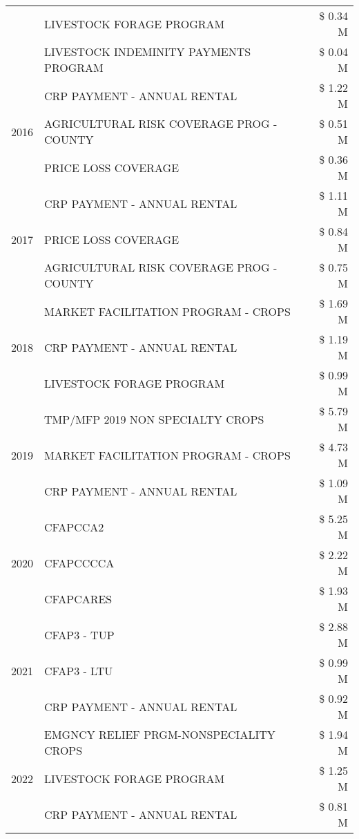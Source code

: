 \begin{tabular}{llr}
 & LIVESTOCK FORAGE PROGRAM & \$ 0.34 M \\
 & LIVESTOCK INDEMINITY PAYMENTS PROGRAM & \$ 0.04 M \\
\cline{1-3}
\multirow[t]{3}{*}{2016} & CRP PAYMENT - ANNUAL RENTAL & \$ 1.22 M \\
 & AGRICULTURAL RISK COVERAGE PROG - COUNTY & \$ 0.51 M \\
 & PRICE LOSS COVERAGE & \$ 0.36 M \\
\cline{1-3}
\multirow[t]{3}{*}{2017} & CRP PAYMENT - ANNUAL RENTAL & \$ 1.11 M \\
 & PRICE LOSS COVERAGE & \$ 0.84 M \\
 & AGRICULTURAL RISK COVERAGE PROG - COUNTY & \$ 0.75 M \\
\cline{1-3}
\multirow[t]{3}{*}{2018} & MARKET FACILITATION PROGRAM - CROPS & \$ 1.69 M \\
 & CRP PAYMENT - ANNUAL RENTAL & \$ 1.19 M \\
 & LIVESTOCK FORAGE PROGRAM & \$ 0.99 M \\
\cline{1-3}
\multirow[t]{3}{*}{2019} & TMP/MFP 2019 NON SPECIALTY CROPS & \$ 5.79 M \\
 & MARKET FACILITATION PROGRAM - CROPS & \$ 4.73 M \\
 & CRP PAYMENT - ANNUAL RENTAL & \$ 1.09 M \\
\cline{1-3}
\multirow[t]{3}{*}{2020} & CFAPCCA2 & \$ 5.25 M \\
 & CFAPCCCCA & \$ 2.22 M \\
 & CFAPCARES & \$ 1.93 M \\
\cline{1-3}
\multirow[t]{3}{*}{2021} & CFAP3 - TUP & \$ 2.88 M \\
 & CFAP3 - LTU & \$ 0.99 M \\
 & CRP PAYMENT - ANNUAL RENTAL & \$ 0.92 M \\
\cline{1-3}
\multirow[t]{3}{*}{2022} & EMGNCY RELIEF PRGM-NONSPECIALITY CROPS & \$ 1.94 M \\
 & LIVESTOCK FORAGE PROGRAM & \$ 1.25 M \\
 & CRP PAYMENT - ANNUAL RENTAL & \$ 0.81 M \\
\cline{1-3}
\bottomrule
\end{tabular}
